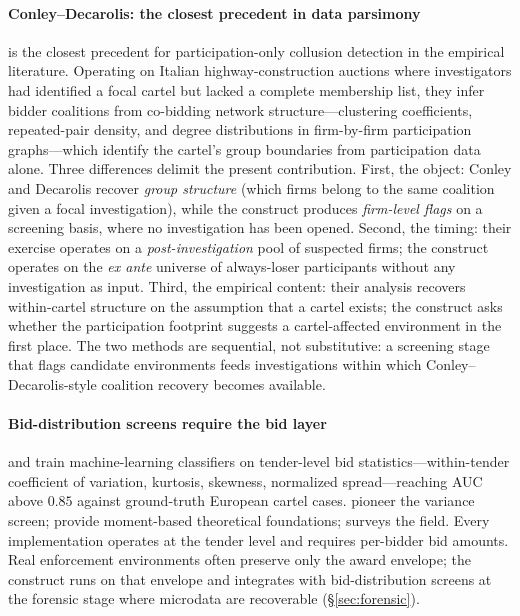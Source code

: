 \paragraph{Conley--Decarolis: the closest precedent in data
parsimony} \citet{conley2016detecting} is the closest precedent
for participation-only collusion detection in the empirical
literature. Operating on Italian highway-construction auctions
where investigators had identified a focal cartel but lacked a
complete membership list, they infer bidder coalitions from
co-bidding network structure---clustering coefficients,
repeated-pair density, and degree distributions in firm-by-firm
participation graphs---which identify the cartel's group
boundaries from participation data alone. Three differences
delimit the present contribution. First, the object: Conley and
Decarolis recover \emph{group structure} (which firms belong to
the same coalition given a focal investigation), while the
construct produces \emph{firm-level flags} on a screening basis,
where no investigation has been opened. Second, the timing:
their exercise operates on a \emph{post-investigation} pool of
suspected firms; the construct operates on the \emph{ex ante}
universe of always-loser participants without any investigation
as input. Third, the empirical content: their analysis recovers
within-cartel structure on the assumption that a cartel exists;
the construct asks whether the participation footprint suggests
a cartel-affected environment in the first place. The two
methods are sequential, not substitutive: a screening stage that
flags candidate environments feeds investigations within which
Conley--Decarolis-style coalition recovery becomes available.

\paragraph{Bid-distribution screens require the bid layer}
\citet{imhof2019detecting,imhof2018screening,huber2019machine}
and \citet{wallimann2023machine} train machine-learning
classifiers on tender-level bid statistics---within-tender
coefficient of variation, kurtosis, skewness, normalized
spread---reaching AUC above $0.85$ against ground-truth European
cartel cases. \citet{abrantesmetz2006a} pioneer the variance
screen; \citet{chassang2022robust} provide moment-based
theoretical foundations; \citet{harrington2008detecting} surveys
the field. Every implementation operates at the tender level and
requires per-bidder bid amounts. Real enforcement environments
often preserve only the award envelope; the construct runs on
that envelope and integrates with bid-distribution screens at
the forensic stage where microdata are recoverable
(§\ref{sec:forensic}).

